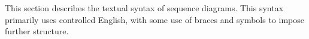 This section describes the textual syntax of \langname{} sequence
diagrams.  This syntax primarily uses controlled English, with
some use of braces and symbols to impose further structure.


